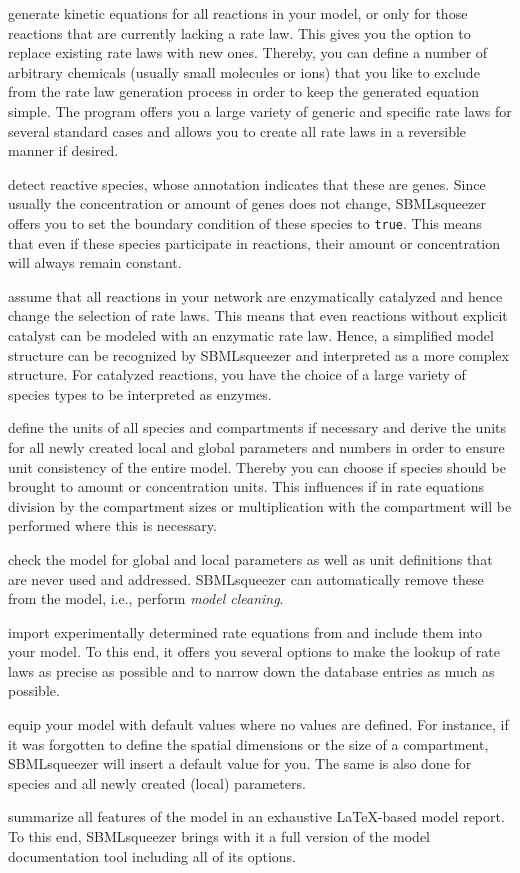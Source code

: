 \begin{dinglist}{52}
\item generate kinetic equations for all reactions in your model, or only for those
  reactions that are currently lacking a rate law.
  This gives you the option to replace existing rate laws with new ones.
  Thereby, you can define a number of arbitrary chemicals (usually small molecules or
  ions) that you like to exclude from the rate law generation process in order to keep
  the generated equation simple.
  The program offers you a large variety of generic and specific rate laws for several
  standard cases and allows you to create all rate laws in a reversible manner if desired.
\item detect reactive species, whose annotation indicates that these are genes.
  Since usually the concentration or amount of genes does not change, SBMLsqueezer
  offers you to set the boundary condition of these species to \texttt{true}.
  This means that even if these species participate in reactions, their amount or
  concentration will always remain constant.
\item assume that all reactions in your network are enzymatically catalyzed and hence
  change the selection of rate laws. This means that even reactions without explicit
  catalyst can be modeled with an enzymatic rate law. Hence, a simplified model structure
  can be recognized by SBMLsqueezer and interpreted as a more complex structure.
  For catalyzed reactions, you have the choice of a large variety of species types to
  be interpreted as enzymes.
\item define the units of all species and compartments if necessary and derive the
  units for all newly created local and global parameters and numbers in order to ensure unit
  consistency of the entire model. Thereby you can choose if species should be brought
  to amount or concentration units. This influences if in rate equations division by
  the compartment sizes or multiplication with the compartment will be performed where
  this is necessary.
\item check the model for global and local parameters as well as unit definitions
  that are never used and addressed. SBMLsqueezer can automatically remove these from
  the model, i.e., perform \emph{model cleaning}.
\item import experimentally determined rate equations from \SABIO and include them into
  your model. To this end, it offers you several options to make the lookup of rate laws
  as precise as possible and to narrow down the database entries as much as possible.
\item equip your model with default values where no values are defined. For instance,
  if it was forgotten to define the spatial dimensions or the size of a compartment,
  SBMLsqueezer will insert a default value for you. The same is also done for species
  and all newly created (local) parameters.
\item summarize all features of the model in an exhaustive \LaTeX-based model report.
  To this end, SBMLsqueezer brings with it a full version of the model documentation
  tool \SBMLLaTeX including all of its options.
\end{dinglist}

